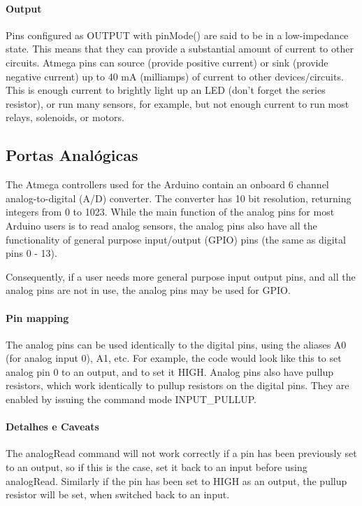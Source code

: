 \paragraph{Output}
Pins configured as OUTPUT with pinMode() are said to be in a low-impedance state. This means that they can provide a substantial amount of current to other circuits. Atmega pins can source (provide positive current) or sink (provide negative current) up to 40 mA (milliamps) of current to other devices/circuits. This is enough current to brightly light up an LED (don't forget the series resistor), or run many sensors, for example, but not enough current to run most relays, solenoids, or motors.



\subsection{Portas Analógicas}
The Atmega controllers used for the Arduino contain an onboard 6 channel analog-to-digital (A/D) converter. The converter has 10 bit resolution, returning integers from 0 to 1023. While the main function of the analog pins for most Arduino users is to read analog sensors, the analog pins also have all the functionality of general purpose input/output (GPIO) pins (the same as digital pins 0 - 13).

Consequently, if a user needs more general purpose input output pins, and all the analog pins are not in use, the analog pins may be used for GPIO.

\paragraph{Pin mapping}
The analog pins can be used identically to the digital pins, using the aliases A0 (for analog input 0), A1, etc. For example, the code would look like this to set analog pin 0 to an output, and to set it HIGH. Analog pins also have pullup resistors, which work identically to pullup resistors on the digital pins. They are enabled by issuing the command mode INPUT_PULLUP.
	 
\paragraph{Detalhes e Caveats}
The analogRead command will not work correctly if a pin has been previously set to an output, so if this is the case, set it back to an input before using analogRead. Similarly if the pin has been set to HIGH as an output, the pullup resistor will be set, when switched back to an input.


